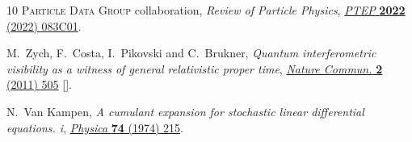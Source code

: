 \documentclass[11pt]{article}
\begin{document}
\begin{thebibliography}{10}
{\scshape Particle Data Group} collaboration, \emph{{Review of Particle
  Physics}}, \href{https://doi.org/10.1093/ptep/ptac097}{\emph{PTEP} {\bfseries
  2022} (2022) 083C01}.

M.~Zych, F.~Costa, I.~Pikovski and C.~Brukner, \emph{{Quantum interferometric
  visibility as a witness of general relativistic proper time}},
  \href{https://doi.org/10.1038/ncomms1498}{\emph{Nature Commun.} {\bfseries 2}
  (2011) 505} [\href{https://arxiv.org/abs/1105.4531}{{}}].

N.~{Van Kampen}, \emph{A cumulant expansion for stochastic linear differential
  equations. i},
  \href{https://doi.org/https://doi.org/10.1016/0031-8914(74)90121-9}{\emph{Physica}
  {\bfseries 74} (1974) 215}.

\end{thebibliography}\endgroup
\end{document}
